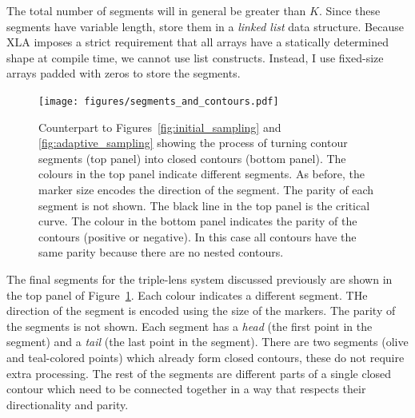 \documentclass[12pt,dvipsnames]{report}
\newcommand{\ssf}[1]{\textsf{#1}}
\begin{document}
The total number of segments will in general be greater than $K$. Since these segments have 
variable length, \citet{2021MNRAS.503.6143K} store them in a 
\emph{linked list} data structure. Because \ssf{XLA} imposes a strict requirement that all 
arrays have a statically determined shape at compile time, we cannot use list constructs. 
Instead, I use fixed-size arrays padded with zeros to store the segments. 
\begin{figure}[t]
    \begin{centering}
        \texttt{[image: figures/segments\_and\_contours.pdf]}
        \caption{Counterpart to Figures~\ref{fig:initial_sampling} and \ref{fig:adaptive_sampling} 
        showing the process of turning contour segments (top panel) into closed contours (bottom
        panel). The colours in the top panel indicate different segments. As before, the marker 
        size encodes the direction of the segment. The parity of each segment is not shown.
        The black line in the top panel is the critical curve. The colour in the bottom 
        panel indicates the parity of the contours (positive or negative). In this case all 
        contours have the  same parity because there are no nested contours.}
        \label{fig:segments_and_contours}
    \end{centering}
\end{figure}

The final segments for the triple-lens system discussed previously are shown in the top panel 
of Figure~\ref{fig:segments_and_contours}. Each colour indicates a different segment. 
THe direction of the segment is encoded using the size of the markers. 
The parity of the segments is not shown.
Each segment has a \emph{head}  (the first point in the segment) 
and a \emph{tail} (the last point in the segment).
There are two segments (olive and teal-colored points) which already form closed contours, these
do not require extra processing. The rest of the segments are different parts of a single
closed contour which need to be connected together in a way that respects their directionality 
and parity. 
\end{document}
